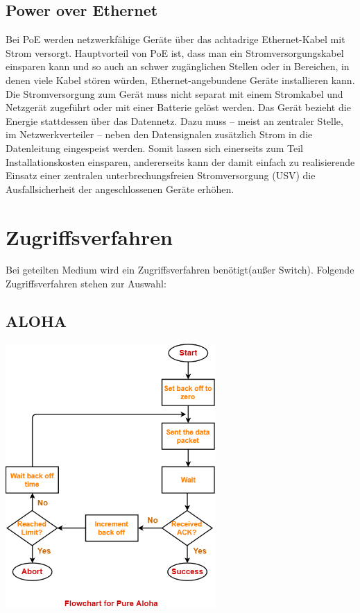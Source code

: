 \documentclass[12pt,a4paper]{article}
\begin{document}
		\subsection{Power over Ethernet}
			Bei PoE werden netzwerkfähige Geräte über das achtadrige Ethernet-Kabel mit Strom versorgt.\newline 
			Hauptvorteil von PoE ist, dass man ein Stromversorgungskabel einsparen kann und so auch an schwer zugänglichen Stellen oder in Bereichen, in denen viele Kabel stören würden, Ethernet-angebundene Geräte installieren kann. Die Stromversorgung zum Gerät muss nicht separat mit einem Stromkabel und Netzgerät zugeführt oder mit einer Batterie gelöst werden. Das Gerät bezieht die Energie stattdessen über das Datennetz. Dazu muss – meist an zentraler Stelle, im Netzwerkverteiler – neben den Datensignalen zusätzlich Strom in die Datenleitung eingespeist werden. Somit lassen sich einerseits zum Teil Installationskosten einsparen, andererseits kann der damit einfach zu realisierende Einsatz einer zentralen unterbrechungsfreien Stromversorgung (USV) die Ausfallsicherheit der angeschlossenen Geräte erhöhen.
		
	\section{Zugriffsverfahren}
		Bei geteilten Medium wird ein Zugriffsverfahren benötigt(außer Switch). Folgende Zugriffsverfahren stehen zur Auswahl:
		
		\subsection{ALOHA}
			\begin{center}
				\includegraphics[width=0.6\textwidth]{Bilder/aloha.png}
			\end{center}
\end{document}
